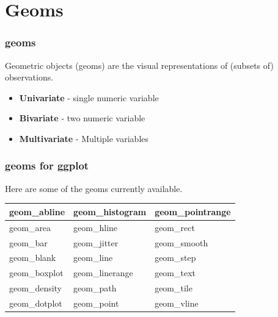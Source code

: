\documentclass{beamer}
\begin{document}

\section{Geoms}
\begin{frame}
	\frametitle{geoms}
	\Large
	Geometric objects (geoms) are the visual representations of (subsets of) observations.\smallskip
	\begin{itemize}
		\item \textbf{Univariate} - single numeric variable
		\item \textbf{Bivariate} - two numeric variable
		\item \textbf{Multivariate} - Multiple variables
	\end{itemize}
\end{frame}
\begin{frame}
	\frametitle{geoms for ggplot}
	\Large
	Here are some of the geoms currently available. \\
	
	\bigskip
	\begin{tabular}{|l|l|l	|}
		\hline
		geom\_abline	&	geom\_histogram	&	geom\_pointrange	\\ \hline
		geom\_area	&	geom\_hline	&	geom\_rect	\\ \hline
		geom\_bar	&	geom\_jitter	&	geom\_smooth	\\ \hline
		geom\_blank	&	geom\_line	&	geom\_step	\\ \hline
		geom\_boxplot	&	geom\_linerange	&	geom\_text	\\ \hline
		geom\_density	&	geom\_path	&	geom\_tile	\\ \hline
		geom\_dotplot	&	geom\_point	&	geom\_vline	\\ \hline
		
		
	\end{tabular} 
\end{frame}
\end{document}
